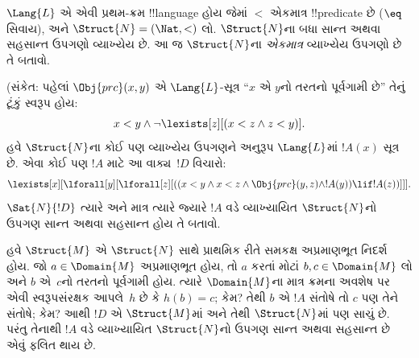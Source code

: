 \documentclass[../../../include/open-logic-section]{subfiles}
\begin{document}
\begin{prob}
$\Lang{L}$ એ એવી પ્રથમ-ક્રમ !!{language}
હોય જેમાં $<$ એકમાત્ર !!{predicate}
છે ($\eq$ સિવાય), અને
$\Struct{N} = (\Nat,
<)$ લો. $\Struct{N}$ના બધા
સાન્ત અથવા સહસાન્ત ઉપગણો
વ્યાખ્યેય છે. આ જ
$\Struct{N}$ના \emph{એકમાત્ર}
વ્યાખ્યેય ઉપગણો છે તે
બતાવો.

(સંકેત: પહેલાં
$\Obj{prc}(x,y)$ એ
$\Lang{L}$-સૂત્ર
“$x$ એ $y$નો
તરતનો પૂર્વગામી છે”
તેનું ટૂંકું સ્વરૂપ
હોય:
\[
x<y \land \lnot \lexists[z][(x<z \land z < y)].
\]
હવે $\Struct{N}$ના
કોઈ પણ વ્યાખ્યેય
ઉપગણને અનુરૂપ
$\Lang{L}$માં
$!A(x)$ સૂત્ર છે.
એવા કોઈ પણ
$!A$ માટે
આ વાક્ય~$!D$
વિચારો:
\[
\lexists[x][\lforall[y][\lforall[z][((x<y \land x<z \land \Obj{prc}(y,z)
  \land !A(y)) \lif !A(z))]]].
\]
$\Sat{N}{!D}$ ત્યારે
અને માત્ર ત્યારે
જ્યારે $!A$ વડે
વ્યાખ્યાયિત
$\Struct{N}$નો
ઉપગણ સાન્ત
અથવા સહસાન્ત
હોય તે બતાવો.

હવે $\Struct{M}$
એ $\Struct{N}$
સાથે પ્રાથમિક
રીતે સમકક્ષ
અપ્રમાણભૂત
નિદર્શ હોય.
જો $a \in
\Domain{M}$
અપ્રમાણભૂત હોય,
તો $a$ કરતાં
મોટાં $b, c \in
\Domain{M}$ લો
અને $b$ એ~$c$નો
તરતનો પૂર્વગામી
હોય. ત્યારે
$\Domain{M}$ના
માત્ર ક્રમના
અવશેષ પર એવી
સ્વરૂપસંરક્ષક
આપલે~$h$ છે
કે $h(b)=c$;
કેમ? તેથી
$b$ એ $!A$
સંતોષે તો
$c$ પણ તેને
સંતોષે; કેમ?
આથી $!D$
એ $\Struct{M}$માં
અને તેથી
$\Struct{N}$માં
પણ સાચું છે.
પરંતુ તેનાથી
$!A$ વડે
વ્યાખ્યાયિત
$\Struct{N}$નો
ઉપગણ સાન્ત
અથવા સહસાન્ત
છે એવું ફલિત
થાય છે.

\end{prob}
\end{document}

